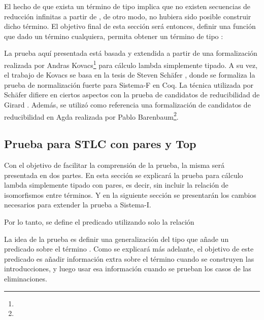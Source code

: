 El hecho de que exista un término de tipo   implica que no existen secuencias de reducción infinitas a partir de , de otro modo, no hubiera sido posible construir dicho término.
El objetivo final de esta sección será entonces, definir una función que dado un término cualquiera, permita obtener un término de tipo  :

\vspace{0.5em}
\AgdaSymbol{:}
\AgdaSymbol{\{}
\AgdaSymbol{\}}
\AgdaSymbol{(}
\AgdaSymbol{:}
\AgdaSymbol{)}
\vspace{0.5em}

La prueba aquí presentada está basada y extendida a partir de una formalización realizada por 
Andras Kovacs\footnote{} para cálculo lambda simplemente tipado.
A su vez, el trabajo de Kovacs se basa en la tesis de Steven Schäfer \cite{Schafer}, donde se formaliza la prueba de normalización fuerte para Sistema-F en Coq.
La técnica utilizada por Schäfer difiere en ciertos aspectos con la prueba de candidatos de reducibilidad de Girard \cite{Girard}.
Además, se utilizó como referencia una formalización de candidatos de reducibilidad en Agda realizada por Pablo Barenbaum\footnote{}.

\subsection{Prueba para STLC con pares y Top}

Con el objetivo de facilitar la comprensión de la prueba, la misma será presentada en dos partes.
En esta sección se explicará la prueba para cálculo lambda simplemente tipado con pares, es decir, sin incluir la relación de isomorfismos entre términos.
Y en la siguiente sección se presentarán los cambios necesarios para extender la prueba a Sistema-I.


Por lo tanto, se define el predicado  utilizando solo la relación \type{$\_\hookrightarrow\_$}


La idea de la prueba es definir una generalización del tipo  que añade un predicado sobre el término .
Como se explicará más adelante, el objetivo de este predicado es añadir información extra sobre el término cuando se construyen las introducciones, y luego usar esa información cuando se prueban los casos de las eliminaciones.

